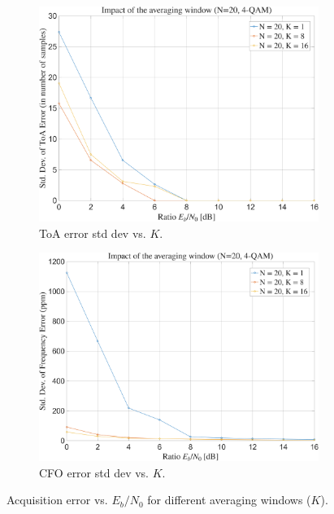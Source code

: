 \documentclass[11pt]{article}
\begin{document}
	\begin{figure}[H]
		\centering
		\begin{subfigure}[b]{0.4\textwidth}
			\includegraphics[width=\linewidth]{Images/frame_sync_K_avg.png} 
			\caption{ToA error std dev vs. $K$.}
		\end{subfigure}
		\hfill
		\begin{subfigure}[b]{0.4\textwidth}
			\includegraphics[width=\linewidth]{Images/cfo_est_K_avg.png} 
			\caption{CFO error std dev vs. $K$.}
		\end{subfigure}
		\caption{Acquisition error vs. $E_b/N_0$ for different averaging windows ($K$).}
		\label{fig:acquisition_vs_K_avg_compact}
	\end{figure}
\end{document}
